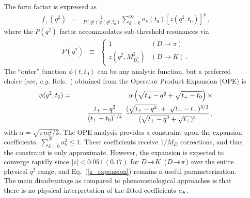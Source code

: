 The form factor is expressed as
\begin{eqnarray}
f_+(q^2) & = & \frac{1}{P(q^2)\,\phi(q^2,t_0)}\sum_{k=0}^\infty
a_k(t_0)[z(q^2,t_0)]^k\,,
\label{z_expansion}
\end{eqnarray}
where the $P(q^2)$ factor accommodates sub-threshold resonances via
\begin{eqnarray}
P(q^2) & \equiv & 
\begin{cases} 
1 & (D\to \pi) \\
z(q^2,M^2_{D^*_s}) & (D\to K)\,. 
\end{cases}
\end{eqnarray}
The ``outer'' function $\phi(t,t_0)$ can be any analytic function,
but a preferred choice (see, {\it e.g.}
Refs.~\cite{Boyd:1994tt,Boyd:1997qw,Bourrely:1980gp}) obtained
from the Operator Product Expansion (OPE) is
\begin{eqnarray}
\phi(q^2,t_0) & =  & \alpha 
\left(\sqrt{t_+ - q^2}+\sqrt{t_+ - t_0}\right) \times  \nonumber \\
 & & \hskip0.20in \frac{t_+ - q^2}{(t_+ - t_0)^{1/4}}\  
\frac{(\sqrt{t_+ - q^2}\ +\ \sqrt{t_+ - t_-})^{3/2}}
     {(\sqrt{t_+ - q^2}+\sqrt{t_+})^5}\,,
\label{eqn:outer}
\end{eqnarray}
with $\alpha = \sqrt{\pi m_c^2/3}$.
The OPE analysis provides a constraint upon the 
expansion coefficients, $\sum_{k=0}^{N}a_k^2 \leq 1$.
These coefficients receive $1/M_D$ corrections, and thus
the constraint is only approximate. However, the
expansion is expected to converge rapidly since 
$|z|<0.051\ (0.17)$ for $D\!\rightarrow\! K$ ($D\!\rightarrow\!\pi$) over 
the entire physical $q^2$ range, and Eq.~(\ref{z_expansion}) 
remains a useful parameterization. The main disadvantage as compared to 
phenomenological approaches is that there is no physical interpretation 
of the fitted coefficients $a_K$.

